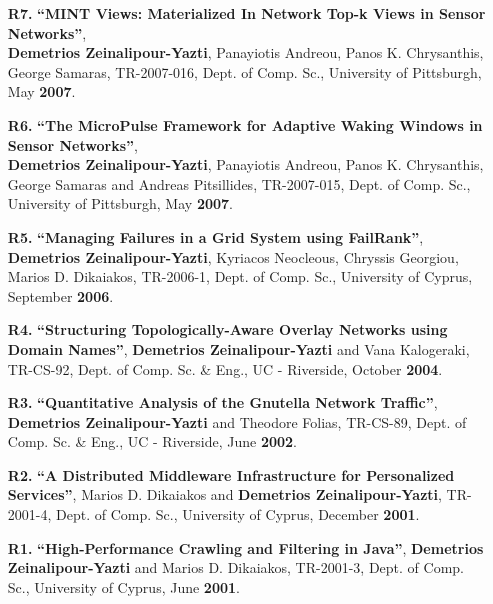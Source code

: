 \documentclass[10pt]{article}
\begin{document}
\begin{enumerate}
\item [{\bf R7.}]
\label{R7}
{\bf ``MINT Views: Materialized In Network Top-k Views in Sensor Networks''}, \\
{\bf Demetrios Zeinalipour-Yazti}, Panayiotis Andreou, Panos K. Chrysanthis, George Samaras, 
TR-2007-016, Dept. of Comp. Sc., University of Pittsburgh, May {\bf 2007}.  

\item [{\bf R6.}]
\label{R6}
{\bf ``The MicroPulse Framework for Adaptive Waking Windows in Sensor Networks''}, \\
{\bf Demetrios Zeinalipour-Yazti}, Panayiotis Andreou, Panos K. Chrysanthis, George Samaras and Andreas Pitsillides, 
TR-2007-015, Dept. of Comp. Sc., University of Pittsburgh, May {\bf 2007}.  

\item [{\bf R5.}]
\label{R5}
{\bf ``Managing Failures in a Grid System using FailRank''}, \\
{\bf Demetrios Zeinalipour-Yazti}, Kyriacos Neocleous, Chryssis Georgiou, Marios D. Dikaiakos, 
TR-2006-1, Dept. of Comp. Sc., University of Cyprus, September {\bf 2006}. 

\item [{\bf R4.}]
\label{R4}
{\bf ``Structuring Topologically-Aware Overlay Networks using Domain Names''},
{\bf Demetrios Zeinalipour-Yazti} and Vana Kalogeraki, 
TR-CS-92, Dept. of Comp. Sc. \& Eng., UC - Riverside, October {\bf 2004}.  

\item [{\bf R3.}]
\label{R3}
{\bf ``Quantitative Analysis of the Gnutella Network Traffic''},
{\bf Demetrios Zeinalipour-Yazti} and Theodore Folias,
TR-CS-89, Dept. of Comp. Sc. \& Eng., UC - Riverside, June {\bf 2002}.  

\item [{\bf R2.}]
\label{R2}
{\bf ``A Distributed Middleware Infrastructure for Personalized Services''},
Marios D. Dikaiakos and {\bf Demetrios Zeinalipour-Yazti},
TR-2001-4, Dept. of Comp. Sc., University of Cyprus, December {\bf 2001}. 

\item [{\bf R1.}]
\label{R1}
{\bf ``High-Performance Crawling and Filtering in Java''},
{\bf Demetrios Zeinalipour-Yazti} and Marios D. Dikaiakos,
TR-2001-3, Dept. of Comp. Sc., University of Cyprus, June {\bf 2001}. 

\end{enumerate}

\newpage
\end{document}
